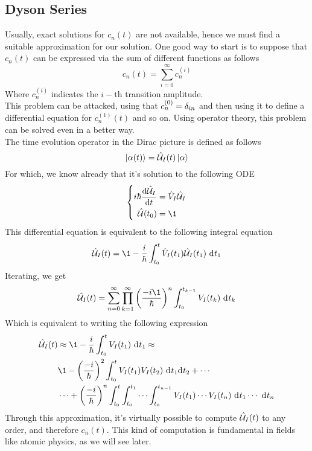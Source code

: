 \documentclass[../qm.tex]{subfiles}
\begin{document}
	\subsection{Dyson Series}
	Usually, exact solutions for $c_n(t)$ are not available, hence we must find a suitable approximation for our solution. One good way to start is to suppose that $c_n(t)$ can be expressed via the sum of different functions as follows
	\begin{equation*}
		c_n(t)=\sum_{i=0}^{\infty}c_n^{(i)}
	\end{equation*}
	Where $c_n^{(i)}$ indicates the $i-$th transition amplitude.\\
	This problem can be attacked, using that $c_n^{(0)}=\delta_{in}$ and then using it to define a differential equation for $c_n^{(1)}(t)$ and so on. Using operator theory, this problem can be solved even in a better way.\\
	The time evolution operator in the Dirac picture is defined as follows
	\begin{equation*}
		\ket{\alpha(t)}=\hat{\mathcal{U}}_I(t)\ket{\alpha}
	\end{equation*}
	For which, we know already that it's solution to the following ODE
	\begin{equation*}
		\left\{\begin{aligned}
			i\hbar\derivative{\Ut_I}{t}&=\opr{V}_I\Ut_I\\
			\Ut(t_0)&=\1
		\end{aligned}\right.
	\end{equation*}
	This differential equation is equivalent to the following integral equation
	\begin{equation*}
		\Ut_I(t)=\1-\frac{i}{\hbar}\int_{t_0}^{t}\opr{V}_I(t_1)\Ut_I(t_1)\diff{t}_1
	\end{equation*}
	Iterating, we get
	\begin{equation}
		\Ut_I(t)=\sum_{n=0}^{\infty}\prod_{k=1}^{\infty}\left( \frac{-i\1}{\hbar} \right)^n\int_{t_0}^{t_{k-1}}V_I(t_k)\diff{t}_k
		\label{eq:dysonseries}
	\end{equation}
	Which is equivalent to writing the following expression
	\begin{equation*}
		\begin{aligned}
		\Ut_I(t)&\approx\1-\frac{i}{\hbar}\int_{t_0}^{t}V_I(t_1)\diff{t}_1\approx\\
		&\1-\left( \frac{-i}{\hbar} \right)^2\int_{t_0}^{t}V_I(t_1)V_I(t_2)\ddiff{t_1}{t_2}+\cdots\\
		&\cdots+\left( \frac{-i}{\hbar} \right)^n\int_{t_0}^{t}\int_{t_0}^{t_1}\cdots\int_{t_0}^{t_{n-1}}V_I(t_1)\cdots V_I(t_n)\diff{t_1}\cdots\diff{t_n}
	\end{aligned}
	\end{equation*}
	Through this approximation, it's virtually possible to compute $\hat{\mathcal{U}}_I(t)$ to any order, and therefore $c_n(t)$. This kind of computation is fundamental in fields like atomic physics, as we will see later.
\end{document}
